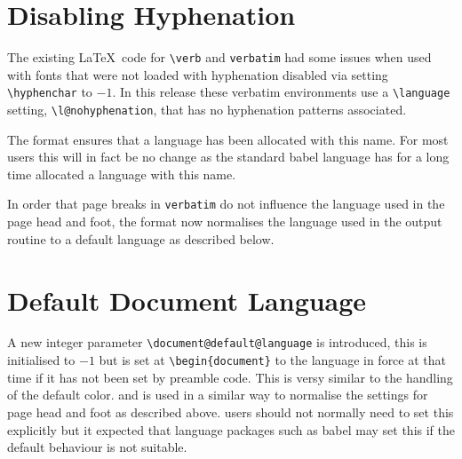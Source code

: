 \documentclass{ltnews}
\begin{document}
\section{Disabling Hyphenation}
The existing \LaTeX\ code for \verb|\verb| and \verb|verbatim| had some
issues when used with fonts that were not loaded with hyphenation
disabled via setting \verb|\hyphenchar| to $-1$. In this release these
verbatim environments use a \verb|\language| setting,
\verb|\l@nohyphenation|, that has no hyphenation patterns associated. 

The format ensures that  a language has been allocated with this name.
For most users this will in fact be no change as the standard
\textsf{babel} language has for a long time allocated a language with
this name.

In order that page breaks in \texttt{verbatim} do not influence the
language used in the page head and foot, the format now normalises the
language used in the output routine to a default language as described
below.
 

\section{Default Document Language}

A new integer parameter \verb|\document@default@language| is
introduced, this is initialised to $-1$ but is set at
\verb|\begin{document}| to the language in force at that time if it
  has not been set by preamble code. This is versy similar to the
  handling of the default color.  and is used in a similar way to
  normalise the settings for page head and foot as described above.
users should not normally need to set this explicitly but it expected that
language packages such as \textsf{babel} may set this if the default
behaviour is not suitable.
\end{document}
